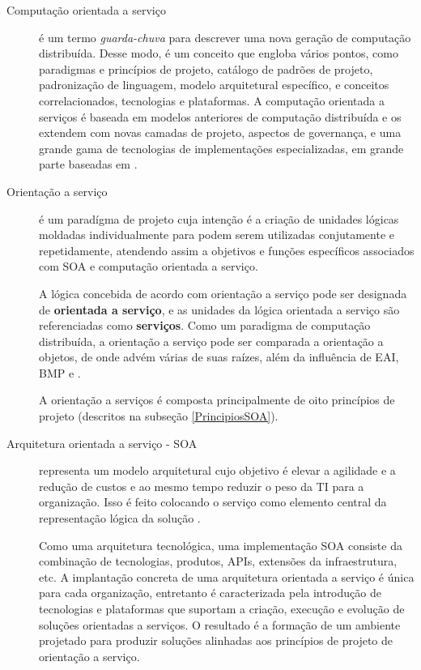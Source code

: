 \begin{description}
\item [Computação orientada a serviço] é um termo \textit{guarda-chuva} para
descrever uma nova geração de computação distribuída. Desse modo, é um conceito
que engloba vários pontos, como paradigmas e princípios de projeto, catálogo de
padrões de projeto, padronização de linguagem, modelo arquitetural específico, e
conceitos correlacionados, tecnologias e plataformas.
A computação orientada a serviços é baseada em modelos anteriores de computação
distribuída e os extendem com novas camadas de projeto, aspectos de governança,
e uma grande gama de tecnologias de implementações especializadas, em grande
parte baseadas em \ws{} \cite{erl2009web}.

\item [Orientação a serviço] é um paradígma de projeto cuja intenção é a criação
de unidades lógicas moldadas individualmente para podem serem utilizadas
conjutamente e repetidamente, atendendo assim a objetivos e
funções específicos associados com SOA e computação orientada a serviço.

A lógica concebida de acordo com orientação a serviço pode ser designada de
\textbf{orientada a serviço}, e as unidades da lógica orientada a serviço são
referenciadas como \textbf{serviços}. Como um paradigma de computação
distribuída, a orientação a serviço pode ser comparada a orientação a objetos,
de onde advém várias de suas raízes, além da influência de EAI, BMP e \ws
\cite{erl2009web}.

A orientação a serviços é composta principalmente de oito princípios de projeto
(descritos na subseção \ref{PrincipiosSOA}).

\item [Arquitetura orientada a serviço - SOA] representa um modelo arquitetural
cujo objetivo é elevar a agilidade e a redução de custos e ao mesmo tempo
reduzir o peso da TI para a organização. Isso é feito colocando o serviço
como elemento central da representação lógica da solução \cite{erl2009web}.

Como uma arquitetura tecnológica, uma implementação SOA consiste da combinação
de tecnologias, produtos, APIs, extensões da infraestrutura, etc. A implantação
concreta de uma arquitetura orientada a serviço é única para cada organização,
entretanto é caracterizada pela introdução de tecnologias e plataformas que
suportam a criação, execução e evolução de soluções orientadas a serviços. O
resultado é a formação de um ambiente projetado para produzir soluções alinhadas
aos princípios de projeto de orientação a serviço.


\end{description}
